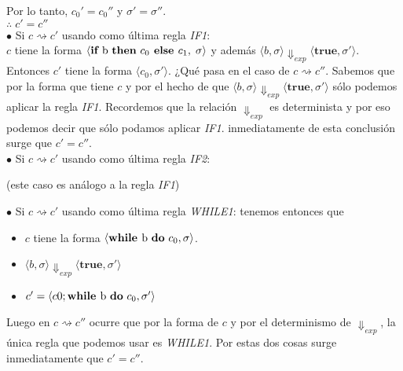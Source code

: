 \documentclass[11pt, fleqn]{article}
\begin{document}
Por lo tanto, $c_0' = c_0''$ y $\sigma' = \sigma''$. \\

$\therefore \; c' = c''$ \\


$\bullet$ Si $ c \rightsquigarrow c' $ usando como última regla \emph{IF1}: \\
$c$ tiene la forma $ \langle \textbf{if } \text{b \textbf{then} } c_0 \textbf{ else } c_1, \; \sigma \rangle$
y además $ \langle b, \sigma \rangle \Downarrow_{exp} \langle \textbf{true}, \sigma' \rangle$.
Entonces $c'$ tiene la forma $ \langle c_0, \sigma' \rangle$. ¿Qué pasa en el caso
de  $ c \rightsquigarrow c'' $. Sabemos que por la forma que tiene $c$ y por el hecho de
que $ \langle b, \sigma \rangle \Downarrow_{exp} \langle \textbf{true}, \sigma' \rangle$
sólo podemos aplicar la regla \emph{IF1}. Recordemos que la relación $\Downarrow_{exp}$ es
determinista y por eso podemos decir que sólo podamos aplicar \emph{IF1}. inmediatamente
de esta conclusión surge que $c' = c''$. \\


$\bullet$ Si $ c \rightsquigarrow c' $ usando como última regla \emph{IF2}:
\begin{center}(este caso es análogo a la regla \emph{IF1})\end{center}


$\bullet$ Si $ c \rightsquigarrow c' $ usando como última regla \emph{WHILE1}: tenemos entonces que
\begin{itemize}
      \item $c$ tiene la forma $ \langle \textbf{while } \text{b \textbf{do} } c_0, \sigma \rangle$.
      \item $ \langle b, \sigma \rangle \Downarrow_{exp} \langle \textbf{true}, \sigma' \rangle$
      \item $c' = \langle c0; \textbf{while } \text{b \textbf{do} } c_0, \sigma' \rangle$
\end{itemize}

Luego en $ c \rightsquigarrow c'' $ ocurre que por la forma de $c$ y por el determinismo
de $\Downarrow_{exp}$, la única regla que podemos usar es \emph{WHILE1}. Por estas dos cosas
surge inmediatamente que $c' = c''$. \\
\end{document}
